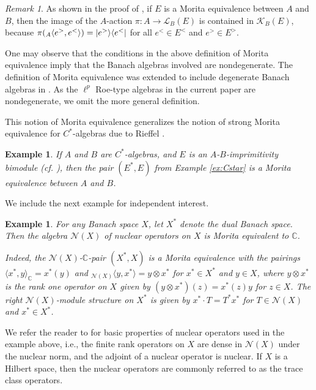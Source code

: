\documentclass[a4,11pt]{amsart}
\newtheorem{ex}[thm]{Example}
\theoremstyle{remark}
\newtheorem{rem}[thm]{Remark}
\DeclarePairedDelimiter\bra{\langle}{\rvert}
\DeclarePairedDelimiter\ket{\lvert}{\rangle}
\begin{document}
\begin{rem}
As shown in the proof of \cite[Proposition 5.21]{Par09}, if $E$ is a Morita equivalence between $A$ and $B$, then the image of the $A$-action $\pi:A\rightarrow\mathcal{L}_B(E)$ is contained in $\mathcal{K}_B(E)$, because $\pi({_A}\langle e^>,e^< \rangle)=\ket{e^>}\bra{e^<}$ for all $e^<\in E^<$ and $e^>\in E^>$.
\end{rem}

One may observe that the conditions in the above definition of Morita equivalence imply that the Banach algebras involved are nondegenerate. The definition of Morita equivalence was extended to include degenerate Banach algebras in \cite[Section 1.2]{Par15}. As the $\ell^p$ Roe-type algebras in the current paper are nondegenerate, we omit the more general definition.



This notion of Morita equivalence generalizes the notion of strong Morita equivalence for $C^*$-algebras due to Rieffel \cite{Rie74}.
\begin{ex}
If $A$ and $B$ are $C^*$-algebras, and $E$ is an $A$-$B$-imprimitivity bimodule (cf. \cite[Definition 3.1]{RW}), then the pair $(E^*,E)$ from Example \ref{ex:Cstar} is a Morita equivalence between $A$ and $B$.
\end{ex}

We include the next example for independent interest.

\begin{ex}
For any Banach space $X$, let $X^*$ denote the dual Banach space. Then the algebra $\mathcal{N}(X)$ of nuclear operators on $X$ is Morita equivalent to $\mathbb{C}$. 

Indeed, the $\mathcal{N}(X)$-$\mathbb{C}$-pair $(X^*,X)$ is a Morita equivalence with the pairings $\langle x^*,y \rangle_\mathbb{C}=x^*(y)$ and ${}_{\mathcal{N}(X)}\langle y,x^* \rangle=y\otimes x^*$ for $x^*\in X^*$ and $y\in X$, where $y\otimes x^*$ is the rank one operator on $X$ given by $(y\otimes x^*)(z)=x^*(z)y$ for $z\in X$.
The right $\mathcal{N}(X)$-module structure on $X^*$ is given by $x^*\cdot T=T^*x^*$ for $T\in\mathcal{N}(X)$ and $x^*\in X^*$.
\end{ex}

We refer the reader to \cite[Propositions 47.2 and 47.5]{Tre} for basic properties of nuclear operators used in the example above, i.e., the finite rank operators on $X$ are dense in $\mathcal{N}(X)$ under the nuclear norm, and the adjoint of a nuclear operator is nuclear.
If $X$ is a Hilbert space, then the nuclear operators are commonly referred to as the trace class operators.
\end{document}

